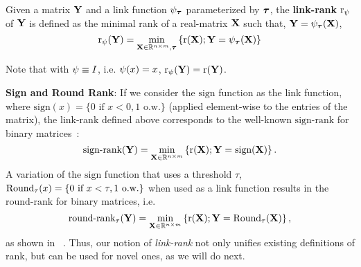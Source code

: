 \documentclass{article}
\newcommand{\para}[1]{\vspace{2mm}\noindent\textbf{#1}:}
\begin{document}
\begin{thm:def}\label{thm:rank}
    Given a matrix $\mathbf{Y}$ and a link function $\psi_{\boldsymbol{\tau}}$ parameterized by ${\boldsymbol{\tau}}$, the \textbf{link-rank} $\mathrm{r}_{\psi}$ of $\mathbf{Y}$ is defined as the minimal rank of a real-matrix $\mathbf{X}$ such that,  $\mathbf{Y} = \psi_{\boldsymbol{\tau}}(\mathbf{X})$,
    \begin{equation} \label{eq:rank}
        \mathrm{r}_{\psi}(\mathbf{Y}) = \min_{\mathbf{X}\in{\mathbb{R}}^{n\times m}, {\boldsymbol{\tau}}} \left\{ \mathrm{r}(\mathbf{X}); \mathbf{Y} = \psi_{\boldsymbol{\tau}}(\mathbf{X}) \right\}
    \end{equation}
\end{thm:def}
Note that with $\psi\equiv I$, i.e. $\psi(x)=x$, $\mathrm{r}_{\psi}(\mathbf{Y})=\mathrm{r}(\mathbf{Y})$. 

\para{Sign and Round Rank}
If we consider the $\text{sign}$ function as the link function, where $
\text{sign}(x)= \{ 0 \text{ if } x<0, 1 \text{ o.w.} \}$
(applied element-wise to the entries of the matrix), the link-rank defined above corresponds to the well-known $\text{sign-rank}$ for binary matrices~\citep{neumann2015some}: 
\[
\text{sign-rank}(\mathbf{Y}) = \min_{\mathbf{X}\in{\mathbb{R}}^{n\times m}} \left\{ \mathrm{r}(\mathbf{X}); \mathbf{Y} = \text{sign}(\mathbf{X}) \right\}.
\]
A variation of the $\text{sign}$ function that uses a threshold $\tau$, $\text{Round}_\tau(x)=\{ 0 \text{ if } x<\tau, 1 \text{ o.w.} \}$ when used as a link function results in the $\text{round-rank}$ for binary matrices, i.e.
\[
\text{round-rank}_{\tau}(\mathbf{Y}) = \min_{\mathbf{X}\in{\mathbb{R}}^{n\times m}} \left\{ \mathrm{r}(\mathbf{X}); \mathbf{Y} = \text{Round}_{\tau}(\mathbf{X}) \right\},
\] %
as shown in ~\citet{neumann2015some}. 
Thus, our notion of \emph{link-rank} not only unifies existing definitions of rank, but can be used for novel ones, as we will do next.
\end{document}
